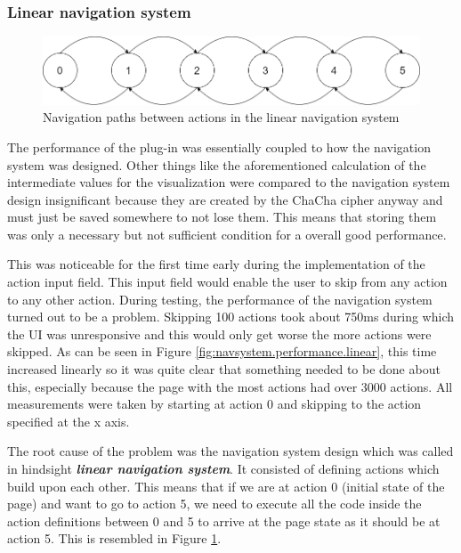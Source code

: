\subsubsection{Linear navigation system}

\begin{figure}
\centering
\includegraphics[width=\textwidth]{figures/navigationsystem-diagram/navigationsystem-linear-overview.png}
\caption[Navigation paths in linear navigation system]{Navigation paths between actions in the linear navigation system}
\label{fig:navsystem.linear.overview}
\end{figure}

The performance of the plug-in was essentially coupled to how the navigation system was designed. Other things like the aforementioned calculation of the intermediate values for the visualization were compared to the navigation system design insignificant because they are created by the ChaCha cipher anyway and must just be saved somewhere to not lose them. This means that storing them was only a necessary but not sufficient condition for a overall good performance.

This was noticeable for the first time early during the implementation of the action input field. This input field would enable the user to skip from any action to any other action. During testing, the performance of the navigation system turned out to be a problem. Skipping 100 actions took about 750ms during which the UI was unresponsive and this would only get worse the more actions were skipped. As can be seen in Figure \ref{fig:navsystem.performance.linear}, this time increased linearly so it was quite clear that something needed to be done about this, especially because the page with the most actions had over 3000 actions. All measurements were taken by starting at action 0 and skipping to the action specified at the x axis.

The root cause of the problem was the navigation system design which was called in hindsight \textbf{\textit{linear navigation system}}. It consisted of defining actions which build upon each other. This means that if we are at action 0 (initial state of the page) and want to go to action 5, we need to execute all the code inside the action definitions between 0 and 5 to arrive at the page state as it should be at action 5. This is resembled in Figure \ref{fig:navsystem.linear.overview}.

